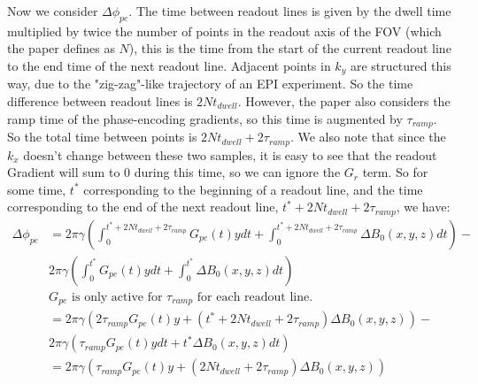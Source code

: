 \documentclass{article}
\begin{document}
Now we consider $\Delta \phi_{pe}$. The time between readout lines is given by the dwell time multiplied by twice the number of
points in the readout axis of the FOV (which the paper defines as $N$), this is the time from the start of the current readout line
to the end time of the next readout line. Adjacent points in $k_y$ are structured this way, due to the "zig-zag"-like trajectory
of an EPI experiment. So the time difference between readout lines is $2Nt_{dwell}$. However, the paper also considers
the ramp time of the phase-encoding gradients, so this time is augmented by $\tau_{ramp}$. So the total time between points
is $2Nt_{dwell} + 2\tau_{ramp}$. We also note that since the $k_x$ doesn't change between these two samples, it is
easy to see that the readout Gradient will sum to 0 during this time, so we can ignore the $G_r$ term. So for some time,
$t^{*}$ corresponding to the beginning of a readout line, and the time corresponding to the end of the next readout line,
$t^{*} + 2Nt_{dwell} + 2\tau_{ramp}$, we have:
\begin{align*}
    \Delta \phi_{pe} &= 2\pi\gamma\left(\int_{0}^{t^{*} + 2Nt_{dwell} + 2\tau_{ramp}}G_{pe}(t)y dt + \int_{0}^{t^{*} + 2Nt_{dwell} + 2\tau_{ramp}}\Delta B_0(x,y,z) dt\right) - \\
    &2\pi\gamma\left(\int_{0}^{t^{*}}G_{pe}(t)y dt + \int_{0}^{t^{*}}\Delta B_0(x,y,z) dt\right) \\
    &G_{pe} \textrm{ is only active for } \tau_{ramp} \textrm { for each readout line.} \\
    &= 2\pi\gamma\left(2\tau_{ramp}G_{pe}(t)y + (t^{*} + 2Nt_{dwell} + 2\tau_{ramp})\Delta B_0(x,y,z)\right) - \\
    &2\pi\gamma\left(\tau_{ramp}G_{pe}(t)y dt + t^{*}\Delta B_0(x,y,z) dt\right) \\
    &= 2\pi\gamma\left(\tau_{ramp}G_{pe}(t)y + (2Nt_{dwell} + 2\tau_{ramp})\Delta B_0(x,y,z)\right)
\end{align*}
\end{document}
